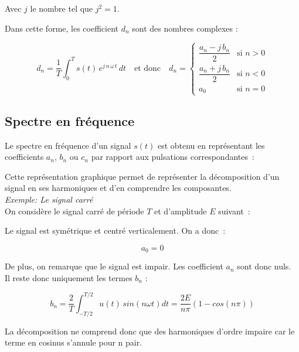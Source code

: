 Avec $j$ le nombre tel que $j^2=1$.

Dans cette forme, les coefficient $d_n$ sont des nombres complexes :

$$ d_n = \dfrac{1}{T} \int_{0}^{T} s(t)\,e^{ j\,n\,\omega\,t }\,dt \quad  \text{et donc} \quad d_n = 
\begin{cases} 
	\dfrac{a_n - j\,b_n}{2} & \text{si } n>0 \\
	\dfrac{a_n + j\,b_n}{2} & \text{si } n<0 \\
	a_0 & \text{si } n=0
\end{cases}
$$  

\subsection*{ Spectre en fréquence }

Le spectre en fréquence d'un signal $s(t)$ est obtenu en représentant les coefficients $a_n$, $b_n$ ou $c_n$ par rapport aux pulsations correspondantes~: \\

\begin{center}

\end{center}

Cette représentation graphique permet de représenter la décomposition d'un signal en ses harmoniques et d'en comprendre les composantes. \\

\textit{Exemple: Le signal carré}\\

On considère le signal carré de période $T$ et d'amplitude $E$ suivant~: 

\begin{center}

\end{center}

Le signal est symétrique et centré verticalement. On a donc~:

$$a_0 = 0$$

De plus, on remarque que le signal est impair. Les coefficient $a_n$ sont donc nuls. \\ Il reste donc uniquement les termes $b_n$ :

$$ b_n = \dfrac{2}{T} \int_{-T/2}^{T/2} u(t)\,sin(n\omega t)dt = \dfrac{2E}{n\pi} \left( 1 - cos(n\pi) \right) $$

La décomposition ne comprend donc que des harmoniques d'ordre impaire car le terme en cosinus s'annule pour n pair.\\


